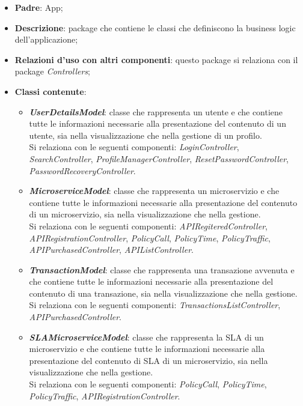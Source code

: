 \begin{itemize}
	\item \textbf{Padre}: App;
	
	\item \textbf{Descrizione}: package che contiene le classi che definiscono la business logic dell'applicazione;
	
	\item \textbf{Relazioni d’uso con altri componenti}: questo package si relaziona con il package \textit{Controllers};
	
	\item \textbf{Classi contenute}:
	\begin{itemize}
		\item \textbf{\textit{UserDetailsModel}}: classe che rappresenta un utente e che contiene tutte le informazioni necessarie alla presentazione del contenuto di un utente, sia nella visualizzazione che nella gestione di un profilo.\\
		Si relaziona con le seguenti componenti: \textit{LoginController}, \textit{SearchController}, \textit{ProfileManagerController}, \textit{ResetPasswordController}, \textit{PasswordRecoveryController}.
		
		\item \textbf{\textit{MicroserviceModel}}: classe che rappresenta un microservizio e che contiene tutte le informazioni necessarie alla presentazione del contenuto di un microservizio, sia nella visualizzazione che nella gestione.\\
		Si relaziona con le seguenti componenti: \textit{APIRegiteredController}, \textit{APIRegistrationController}, \textit{PolicyCall}, \textit{PolicyTime}, \textit{PolicyTraffic}, \textit{APIPurchasedController}, \textit{APIListController}.
		
		\item \textbf{\textit{TransactionModel}}:  classe che rappresenta una transazione avvenuta e che contiene tutte le informazioni necessarie alla presentazione del contenuto di una transazione, sia nella visualizzazione che nella gestione.\\
		Si relaziona con le seguenti componenti: \textit{TransactionsListController}, \textit{APIPurchasedController}.
		
		\item \textbf{\textit{SLAMicroserviceModel}}:  classe che rappresenta la SLA di un microservizio e che contiene tutte le informazioni necessarie alla presentazione del contenuto di SLA di un microservizio, sia nella visualizzazione che nella gestione.\\
		Si relaziona con le seguenti componenti: \textit{PolicyCall}, \textit{PolicyTime}, \textit{PolicyTraffic}, \textit{APIRegistrationController}.
	\end{itemize}
\end{itemize}
	

